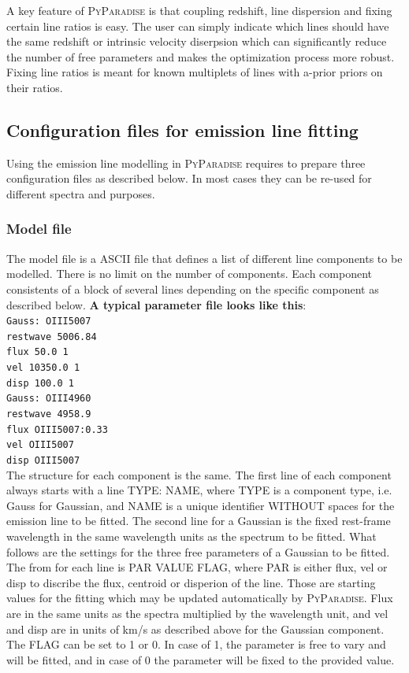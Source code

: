 \documentclass[usenatbib,usegraphicx,useAMS,onecolumn]{mn2e}
\newcommand{\codeline}[1]{\lstinline|#1|}
\begin{document}
A key feature of \textsc{PyParadise} is that coupling redshift, line dispersion and fixing certain line ratios is easy. The user can simply indicate which lines should have the same redshift or intrinsic velocity diserpsion which can significantly reduce the number of free parameters and makes the optimization process more robust. Fixing line ratios is meant for known multiplets of lines with a-prior priors on their ratios.

\subsection{Configuration files for emission line fitting}\label{subsec:em_config}
Using the emission line modelling in \textsc{PyParadise} requires to prepare three configuration files as described below. In most cases they can be re-used for different spectra and purposes.

\subsubsection{Model file}\label{subsec:model_file}
The model file is a ASCII file that defines a list of different line components to be modelled. There is no limit on the number of components. Each component consistents of a block of several lines depending on the specific component as described below. \textbf{A typical parameter file looks like this}:\bigskip\\
\codeline{Gauss: OIII5007}\\
\codeline{restwave 5006.84}\\
\codeline{flux 50.0 1}\\
\codeline{vel 10350.0 1}\\
\codeline{disp 100.0 1}\bigskip\\
\codeline{Gauss: OIII4960}\\
\codeline{restwave 4958.9}\\
\codeline{flux OIII5007:0.33}\\
\codeline{vel OIII5007}\\
\codeline{disp OIII5007}\\

The structure for each component is the same. The first line of each component always starts with a line TYPE: NAME, where TYPE is a component type, i.e. Gauss for Gaussian, and NAME is a unique identifier WITHOUT spaces for the emission line to be fitted. The second line for a Gaussian is the fixed rest-frame wavelength in the same wavelength units as the spectrum to be fitted. What follows are the settings for the three free parameters of a Gaussian to be fitted. The from for each line is PAR VALUE FLAG, where PAR is either flux, vel or disp to discribe the flux, centroid or disperion of the line. Those are starting values for the fitting which may be updated automatically by \textsc{PyParadise}. Flux are in the same units as the spectra multiplied by the wavelength unit, and vel and disp are in units of km/s as described above for the Gaussian component. The FLAG can be set to 1 or 0. In case of 1, the parameter is free to vary and will be fitted, and in case of 0 the parameter will be fixed to the provided value. 
\end{document}
